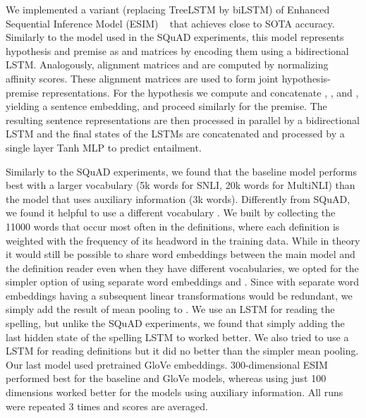 We implemented a variant (replacing TreeLSTM by biLSTM) of Enhanced Sequential
Inference Model (ESIM) ~\citep{DBLP:journals/corr/ChenZLWJ16} that achieves close to SOTA accuracy. Similarly to the model used in the SQuAD experiments, this model represents hypothesis and premise as  and  matrices by encoding them using a bidirectional LSTM. Analogously, alignment matrices  and   are computed by normalizing affinity scores. These alignment matrices are used to form joint hypothesis-premise representations. 
For the hypothesis we compute and concatenate , ,  and , yielding a  sentence embedding, and proceed similarly for the premise. The resulting sentence representations are then processed in parallel by a bidirectional LSTM and the final states of the LSTMs are concatenated and processed by a single layer Tanh MLP to predict entailment.

Similarly to the SQuAD experiments, we found that the baseline model performs best with a larger vocabulary (5k words for SNLI, 20k words for MultiNLI) than the model that uses auxiliary information (3k words). Differently from SQuAD, we found it helpful to use a different vocabulary . We built  by collecting the 11000 words that occur most often in the definitions, where each definition is weighted with the frequency of its headword in the training data. While in theory it would still be possible to share word embeddings between the main model and the definition reader even when they have different vocabularies, we opted for the simpler option of using separate word embeddings  and . Since with separate word embeddings having a subsequent linear transformations would be redundant, we simply add the result of mean pooling  to . We use an LSTM for reading the spelling, but unlike the SQuAD experiments, we found that simply adding the last hidden state of the spelling LSTM to  worked better. We also tried to use a LSTM for reading definitions but it did no better than the simpler mean pooling. Our last model used pretrained GloVe embeddings. 300-dimensional ESIM performed best for the baseline and GloVe models, whereas using just 100 dimensions worked better for the models using auxiliary information. 
All runs were repeated 3 times and scores are averaged. 



